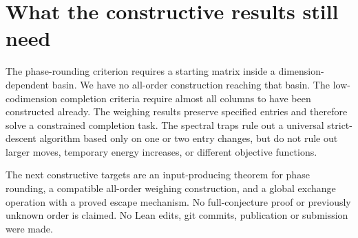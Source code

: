 \documentclass[11pt]{article}
\begin{document}
\section{What the constructive results still need}
The phase-rounding criterion requires a starting matrix inside a
dimension-dependent basin. We have no all-order construction reaching
that basin. The low-codimension completion criteria require almost all
columns to have been constructed already. The weighing results preserve
specified entries and therefore solve a constrained completion task.
The spectral traps rule out a universal strict-descent algorithm based
only on one or two entry changes, but do not rule out larger moves,
temporary energy increases, or different objective functions.

The next constructive targets are an input-producing theorem for
phase rounding, a compatible all-order weighing construction, and
a global exchange operation with a proved escape mechanism.
No full-conjecture proof or previously unknown order is claimed.
No Lean edits, git commits, publication or submission were made.
\end{document}
